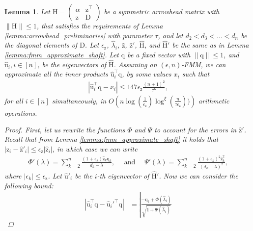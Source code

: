 \documentclass{article}
\newcommand{\labs}{\left|}
\newcommand{\rabs}{\right|}
\newcommand{\lpar}{\left(}
\newcommand{\rpar}{\right)}
\newtheorem{lemma}{Lemma}[section]
\newcommand\vecq{\boldsymbol{\mathrm{q}}}
\newcommand\vecz{\boldsymbol{\mathrm{z}}}
\newcommand\vecuhat{\widehat{\boldsymbol{\mathrm{u}}}}
\newcommand\veczhat{\widehat{\boldsymbol{\mathrm{z}}}}
\newcommand\matD{\boldsymbol{\mathrm{D}}}
\newcommand\matH{\boldsymbol{\mathrm{H}}}
\newcommand\matHhat{\widehat{\boldsymbol{\mathrm{H}}}}
\newcommand{\cfmm}{\xi}
\newcommand{\fmmalgo}{FMM} \usepackage[utf8]{inputenc}
\begin{document}
\begin{lemma}
    \label{lemma:fmm_approximate_inner_products}
        Let $\matH=\begin{pmatrix}
            \alpha & \vecz^\top\\
            \vecz & \matD
        \end{pmatrix}
        $
        be a symmetric arrowhead matrix with $\|\matH\|\leq 1$, that satisfies the requirements of Lemma \ref{lemma:arrowhead_preliminaries} with parameter $\tau$, and let $d_2 < d_3 < \ldots < d_n$ be the diagonal elements of  $\matD$. Let $\epsilon_{\vecz}$, $\widehat\lambda_i$, $\veczhat$, $\veczhat'$, $\matHhat$, and $\matHhat'$ be the same as in Lemma \ref{lemma:fmm_approximate_shaft}. 
        Let $\vecq$ be a fixed vector with $\|\vecq\|\leq 1$, and $\vecuhat_i, i\in[n]$, be the eigenvectors of $\matHhat$.
        Assuming an $(\epsilon,n)$-\fmmalgo, we can approximate all the inner products 
        $\vecuhat_i^\top\vecq$,  by some values $x_i$ such that 
        \begin{align*}
            |\vecuhat_i^\top\vecq - x_i| \leq 147\epsilon_{\vecz}
                \tfrac{(n+1)^2}{\tau^6},
        \end{align*}
        for all $i\in[n]$ simultaneously, in $O\lpar
            n\log(\tfrac{1}{\epsilon_{\vecz}})
            \log^{\cfmm}(\tfrac{n}{\tau\epsilon_{\vecz}}))
        \rpar$ arithmetic operations.
    \begin{proof}        
        First, let us rewrite the functions $\Phi$ and $\Psi$ to account for the errors in $\veczhat'$. Recall that from Lemma \ref{lemma:fmm_approximate_shaft} it holds that $|\veczhat_i-\veczhat'_i|\leq \epsilon_{\vecz}|\veczhat_i|$, in which case we can write 
        \begin{align*}
        \Phi'(\lambda)=\sum_{k=2}^n\frac{(1+\epsilon_k)\veczhat_k\vecq_k}{d_k-\lambda},
            \quad \text{ and } \quad
        \Psi'(\lambda)=
            \sum_{k=2}^n
                \frac{(1+\epsilon_k)^2\veczhat^2_k}{(d_k-\lambda)^2},
        \end{align*}
        where $|\epsilon_k|\leq\epsilon_{\vecz}$. Let $\vecuhat'_i$ be the $i$-th eigenvector of $\matHhat'$.
        Now we can consider the following bound:
        \begin{align}
            \labs
            \vecuhat_i^\top\vecq
            -
            \vecuhat_i'^\top\vecq
            \rabs
            &=
            \labs
            \frac{-\vecq_1+\Phi(\widehat\lambda_i)}{\sqrt{1+\Psi(\widehat\lambda_i)}}

\end{align}
\end{proof}
\end{lemma}
\end{document}
